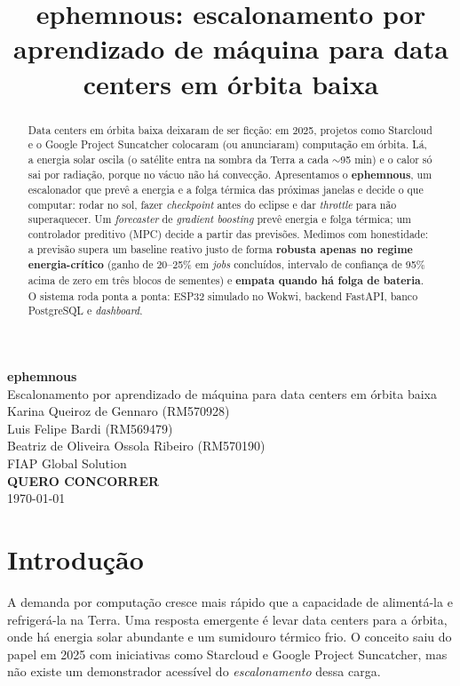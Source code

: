 \documentclass[11pt]{article}
\title{\vspace{-1.5cm}\bfseries ephemnous: escalonamento por aprendizado de m\'aquina para data centers em \'orbita baixa}
\date{}
\begin{document}
\begin{center}
{\LARGE\bfseries ephemnous}\\[0.3em]
{\large Escalonamento por aprendizado de m\'aquina para data centers em \'orbita baixa}\\[1.2em]
{\large Karina Queiroz de Gennaro (RM570928)}\\
{\large Luis Felipe Bardi (RM569479)}\\
{\large Beatriz de Oliveira Ossola Ribeiro (RM570190)}\\[0.8em]
{\large FIAP Global Solution}\\[1.2em]
{\Large\bfseries QUERO CONCORRER}\\[1.0em]
\today
\end{center}

\vspace{0.5em}

\begin{abstract}
\noindent
Data centers em \'orbita baixa deixaram de ser fic\c{c}\~ao: em 2025, projetos como Starcloud e o Google Project Suncatcher colocaram (ou anunciaram) computa\c{c}\~ao em \'orbita. L\'a, a energia solar oscila (o sat\'elite entra na sombra da Terra a cada $\sim$95 min) e o calor s\'o sai por radia\c{c}\~ao, porque no v\'acuo n\~ao h\'a convec\c{c}\~ao. Apresentamos o \textbf{ephemnous}, um escalonador que prev\^e a energia e a folga t\'ermica das pr\'oximas janelas e decide o que computar: rodar no sol, fazer \emph{checkpoint} antes do eclipse e dar \emph{throttle} para n\~ao superaquecer. Um \emph{forecaster} de \emph{gradient boosting} prev\^e energia e folga t\'ermica; um controlador preditivo (MPC) decide a partir das previs\~oes. Medimos com honestidade: a previs\~ao supera um baseline reativo justo de forma \textbf{robusta apenas no regime energia-cr\'itico} (ganho de 20--25\% em \emph{jobs} conclu\'idos, intervalo de confian\c{c}a de 95\% acima de zero em tr\^es blocos de sementes) e \textbf{empata quando h\'a folga de bateria}. O sistema roda ponta a ponta: ESP32 simulado no Wokwi, backend FastAPI, banco PostgreSQL e \emph{dashboard}.
\end{abstract}

\section{Introdu\c{c}\~ao}

A demanda por computa\c{c}\~ao cresce mais r\'apido que a capacidade de aliment\'a-la e refriger\'a-la na Terra. Uma resposta emergente \'e levar data centers para a \'orbita, onde h\'a energia solar abundante e um sumidouro t\'ermico frio. O conceito saiu do papel em 2025 com iniciativas como Starcloud e Google Project Suncatcher, mas n\~ao existe um demonstrador acess\'ivel do \emph{escalonamento} dessa carga.
\end{document}
